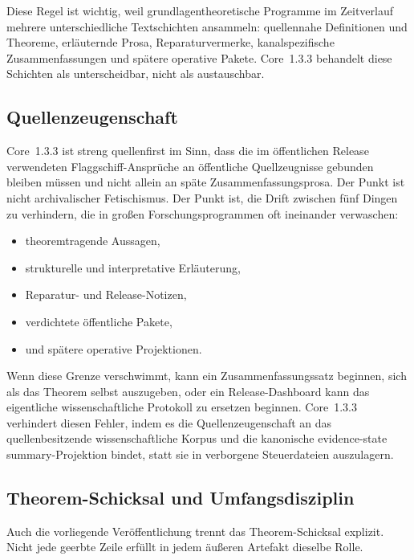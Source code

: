 Diese Regel ist wichtig, weil grundlagentheoretische Programme im Zeitverlauf
mehrere unterschiedliche Textschichten ansammeln: quellennahe Definitionen und
Theoreme, erläuternde Prosa, Reparaturvermerke, kanalspezifische
Zusammenfassungen und spätere operative Pakete. Core~1.3.3 behandelt diese
Schichten als unterscheidbar, nicht als austauschbar.

\subsection{Quellenzeugenschaft}

Core~1.3.3 ist streng quellenfirst im Sinn, dass die im öffentlichen Release
verwendeten Flaggschiff-Ansprüche an öffentliche Quellzeugnisse gebunden
bleiben müssen und nicht allein an späte Zusammenfassungsprosa. Der Punkt ist
nicht archivalischer Fetischismus. Der Punkt ist, die Drift zwischen fünf
Dingen zu verhindern, die in großen Forschungsprogrammen oft ineinander
verwaschen:

\begin{itemize}
\item theoremtragende Aussagen,
\item strukturelle und interpretative Erläuterung,
\item Reparatur- und Release-Notizen,
\item verdichtete öffentliche Pakete,
\item und spätere operative Projektionen.
\end{itemize}

Wenn diese Grenze verschwimmt, kann ein Zusammenfassungssatz beginnen, sich als
das Theorem selbst auszugeben, oder ein Release-Dashboard kann das eigentliche
wissenschaftliche Protokoll zu ersetzen beginnen. Core~1.3.3 verhindert diesen
Fehler, indem es die Quellenzeugenschaft an das quellenbesitzende
wissenschaftliche Korpus und die kanonische evidence-state summary-Projektion bindet, statt sie
in verborgene Steuerdateien auszulagern.

\subsection{Theorem-Schicksal und Umfangsdisziplin}

Auch die vorliegende Veröffentlichung trennt das Theorem-Schicksal explizit.
Nicht jede geerbte Zeile erfüllt in jedem äußeren Artefakt dieselbe Rolle.

